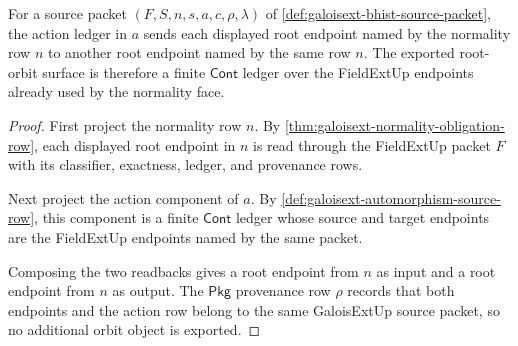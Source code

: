 \begin{theorem}
\label{thm:galoisext-normal-root-orbit-closure}
For a source packet $(F,S,n,s,a,c,\rho,\lambda)$ of
\autoref{def:galoisext-bhist-source-packet}, the action ledger in $a$ sends
each displayed root endpoint named by the normality row $n$ to another root
endpoint named by the same row $n$. The exported root-orbit surface is
therefore a finite $\mathsf{Cont}$ ledger over the FieldExtUp endpoints already
used by the normality face.
\end{theorem}
\begin{proof}
First project the normality row $n$. By
\autoref{thm:galoisext-normality-obligation-row}, each displayed root endpoint
in $n$ is read through the FieldExtUp packet $F$ with its classifier,
exactness, ledger, and provenance rows.

Next project the action component of $a$. By
\autoref{def:galoisext-automorphism-source-row}, this component is a finite
$\mathsf{Cont}$ ledger whose source and target endpoints are the FieldExtUp
endpoints named by the same packet.

Composing the two readbacks gives a root endpoint from $n$ as input and a root
endpoint from $n$ as output. The $\mathsf{Pkg}$ provenance row $\rho$ records
that both endpoints and the action row belong to the same GaloisExtUp source
packet, so no additional orbit object is exported.
\end{proof}

